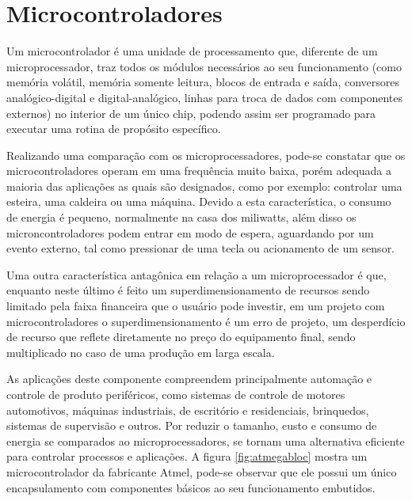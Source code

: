 \newpage
\section{Microcontroladores}

Um microcontrolador é uma unidade de processamento que, diferente de um microprocessador, traz todos os módulos necessários ao seu funcionamento (como memória volátil, memória somente leitura, blocos de entrada e saída, conversores analógico-digital e digital-analógico, linhas para troca de dados com componentes externos) no interior de um único chip, podendo assim ser programado para executar uma rotina de propósito específico.

Realizando uma comparação com os microprocessadores, pode-se constatar que os microcontroladores operam em uma frequência muito baixa, porém adequada a maioria das aplicações as quais são designados, como por exemplo: controlar uma esteira, uma caldeira ou uma máquina. Devido a esta característica, o consumo de energia é pequeno, normalmente na casa dos miliwatts, além disso os microncontroladores podem entrar em modo de espera, aguardando por um evento externo, tal como pressionar de uma tecla ou acionamento de um sensor.

Uma outra característica antagônica em relação a um microprocessador é que, enquanto neste último é feito um superdimensionamento de recursos sendo limitado pela faixa financeira que o usuário pode investir, em um projeto com microcontroladores o superdimensionamento é um erro de projeto, um desperdício de recurso que reflete diretamente no preço do equipamento final, sendo multiplicado no caso de uma produção em larga escala.

As aplicações deste componente compreendem principalmente automação e controle de produto periféricos, como sistemas de controle de motores automotivos, máquinas industriais, de escritório e residenciais, brinquedos, sistemas de supervisão e outros. Por reduzir o tamanho, custo e consumo de energia se comparados ao microprocessadores, se tornam uma alternativa eficiente para controlar processos e aplicações. A figura \ref{fig:atmegabloc} mostra um microcontrolador da fabricante Atmel, pode-se observar que ele possui um único encapsulamento com componentes básicos ao seu funcionamento embutidos.


